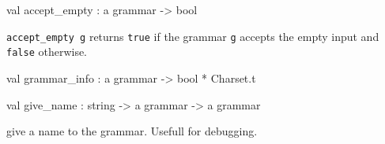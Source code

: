 \documentclass[11pt]{article}
\begin{document}
\label{val:Earley.accept-underscoreempty}\begin{ocamldoccode}
val accept_empty : {\textquotesingle}a grammar -> bool
\end{ocamldoccode}
\begin{ocamldocdescription}
{\tt{accept\_empty g}} returns {\tt{true}} if the grammar {\tt{g}} accepts the empty input
    and {\tt{false}} otherwise.


\end{ocamldocdescription}




\label{val:Earley.grammar-underscoreinfo}\begin{ocamldoccode}
val grammar_info : {\textquotesingle}a grammar -> bool * Charset.t
\end{ocamldoccode}




\label{val:Earley.give-underscorename}\begin{ocamldoccode}
val give_name : string -> {\textquotesingle}a grammar -> {\textquotesingle}a grammar
\end{ocamldoccode}
\begin{ocamldocdescription}
give a name to the grammar. Usefull for debugging.


\end{ocamldocdescription}
\end{document}
